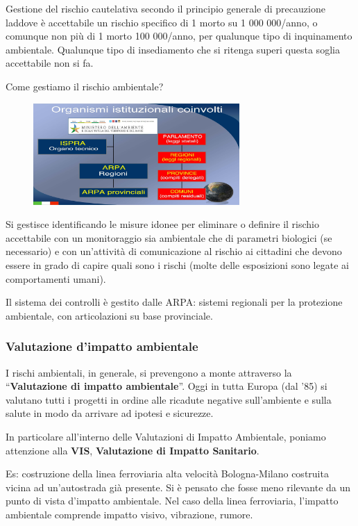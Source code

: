 Gestione del rischio cautelativa secondo il principio generale di
precauzione laddove è accettabile un rischio specifico di 1 morto su 1
000 000/anno, o comunque non più di 1 morto 100 000/anno, per qualunque
tipo di inquinamento ambientale. Qualunque tipo di insediamento che si
ritenga superi questa soglia accettabile non si fa.

Come gestiamo il rischio ambientale?

\begin{figure}[!ht]
\centering
	\includegraphics[width=0.7\textwidth]{22/image8.jpeg}
	\end{figure}
	
Si
gestisce identificando le misure idonee per eliminare o definire il
rischio accettabile con un monitoraggio sia ambientale che di parametri
biologici (se necessario) e con un'attività di comunicazione al rischio
ai cittadini che devono essere in grado di capire quali sono i rischi
(molte delle esposizioni sono legate ai comportamenti umani).

Il sistema dei controlli è gestito dalle ARPA: sistemi regionali per la
protezione ambientale, con articolazioni su base provinciale.

\subsubsection{Valutazione d'impatto ambientale}

I rischi ambientali, in generale, si prevengono a monte attraverso la
``\textbf{Valutazione di impatto ambientale}''. Oggi in tutta Europa
(dal '85) si valutano tutti i progetti in ordine alle ricadute negative
sull'ambiente e sulla salute in modo da arrivare ad ipotesi e sicurezze.

In particolare all'interno delle Valutazioni di Impatto Ambientale,
poniamo attenzione alla \textbf{VIS}, \textbf{Valutazione di Impatto
Sanitario}.

Es: costruzione della linea ferroviaria alta velocità Bologna-Milano
costruita vicina ad un'autostrada già presente. Si è pensato che fosse
meno rilevante da un punto di vista d'impatto ambientale. Nel caso della
linea ferroviaria, l'impatto ambientale comprende impatto visivo,
vibrazione, rumore.

